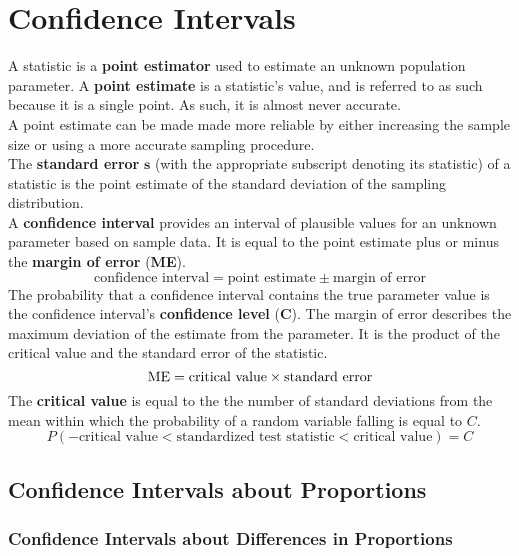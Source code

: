 \documentclass[../AP_Statistics.tex]{subfiles}
\begin{document}
	\chapter{Confidence Intervals}
		A statistic is a \textbf{point estimator} used to estimate an unknown population parameter. A \textbf{point estimate} is a statistic's value, and is referred to as such because it is a single point. As such, it is almost never accurate. \\
		A point estimate can be made made more reliable by either increasing the sample size or using a more accurate sampling procedure. \\
		The \textbf{standard error} $\bm{s}$ (with the appropriate subscript denoting its statistic) of a statistic is the point estimate of the standard deviation of the sampling distribution. \\
		A \textbf{confidence interval} provides an interval of plausible values for an unknown parameter based on sample data. It is equal to the point estimate plus or minus the \textbf{margin of error} (\textbf{ME}).
		\[\text{confidence interval} = \text{point estimate} \pm \text{margin of error}\]
		The probability that a confidence interval contains the true parameter value is the confidence interval's \textbf{confidence level} ($\bm{C}$).
		The margin of error describes the maximum deviation of the estimate from the parameter. It is the product of the critical value and the standard error of the statistic.
		\[\operatorname{ME} = \text{critical value} \times \text{standard error}\]
		The \textbf{critical value} is equal to the the number of standard deviations from the mean within which the probability of a random variable falling is equal to $C$.
		\[P(-\text{critical value} < \text{standardized test statistic} < \text{critical value}) = C\]
		\section{Confidence Intervals about Proportions}
			\subsection*{Confidence Intervals about Differences in Proportions}
\end{document}

